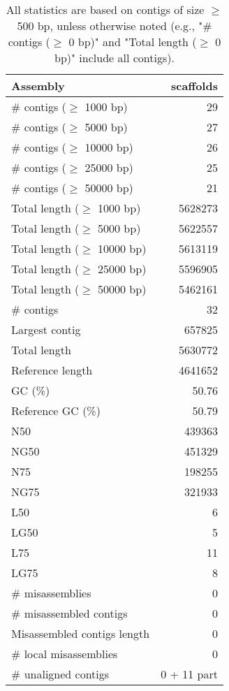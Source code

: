 \documentclass[12pt,a4paper]{article}
\begin{document}
\begin{table}[ht]
\begin{center}
\caption{All statistics are based on contigs of size $\geq$ 500 bp, unless otherwise noted (e.g., "\# contigs ($\geq$ 0 bp)" and "Total length ($\geq$ 0 bp)" include all contigs).}
\begin{tabular}{|l*{1}{|r}|}
\hline
Assembly & scaffolds \\ \hline
\# contigs ($\geq$ 1000 bp) & 29 \\ \hline
\# contigs ($\geq$ 5000 bp) & 27 \\ \hline
\# contigs ($\geq$ 10000 bp) & 26 \\ \hline
\# contigs ($\geq$ 25000 bp) & 25 \\ \hline
\# contigs ($\geq$ 50000 bp) & 21 \\ \hline
Total length ($\geq$ 1000 bp) & 5628273 \\ \hline
Total length ($\geq$ 5000 bp) & 5622557 \\ \hline
Total length ($\geq$ 10000 bp) & 5613119 \\ \hline
Total length ($\geq$ 25000 bp) & 5596905 \\ \hline
Total length ($\geq$ 50000 bp) & 5462161 \\ \hline
\# contigs & 32 \\ \hline
Largest contig & 657825 \\ \hline
Total length & 5630772 \\ \hline
Reference length & 4641652 \\ \hline
GC (\%) & 50.76 \\ \hline
Reference GC (\%) & 50.79 \\ \hline
N50 & 439363 \\ \hline
NG50 & 451329 \\ \hline
N75 & 198255 \\ \hline
NG75 & 321933 \\ \hline
L50 & 6 \\ \hline
LG50 & 5 \\ \hline
L75 & 11 \\ \hline
LG75 & 8 \\ \hline
\# misassemblies & 0 \\ \hline
\# misassembled contigs & 0 \\ \hline
Misassembled contigs length & 0 \\ \hline
\# local misassemblies & 0 \\ \hline
\# unaligned contigs & 0 + 11 part \\ \hline

\end{tabular}
\end{center}
\end{table}
\end{document}
